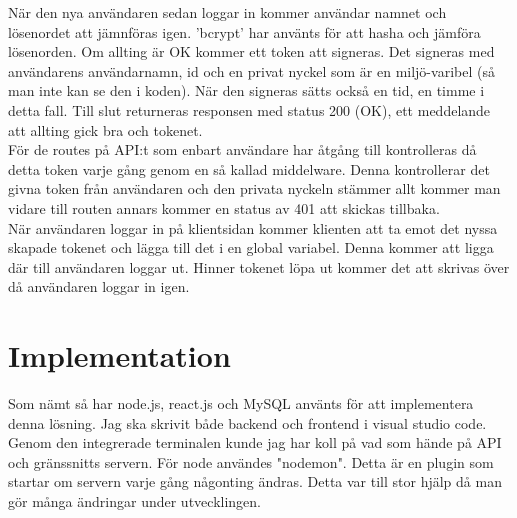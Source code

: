 \documentclass{article}
\begin{document}
\noindent
När den nya användaren sedan loggar in kommer användar namnet och lösenordet att jämnföras igen.
'bcrypt' har använts för att hasha och jämföra lösenorden. 
Om allting är OK kommer ett token att signeras.
Det signeras med användarens användarnamn, id och en privat nyckel som är en miljö-varibel (så man inte kan se den i koden). När den signeras sätts också en tid, en timme i detta fall. Till slut returneras responsen med status 200 (OK), ett meddelande att allting gick bra och tokenet.\\

\noindent
För de routes på API:t som enbart användare har åtgång till kontrolleras då detta token varje gång genom en så kallad middelware. Denna kontrollerar det givna token från användaren och den privata nyckeln stämmer allt kommer man vidare till routen annars kommer en status av 401 att skickas tillbaka.\\

\noindent
När användaren loggar in på klientsidan kommer klienten att ta emot det nyssa skapade tokenet och lägga till det i en global variabel. Denna kommer att ligga där till användaren loggar ut. Hinner tokenet löpa ut kommer det att skrivas över då användaren loggar in igen.


\section{Implementation}%
\label{sec:implementation}
Som nämt så har node.js, react.js och MySQL använts för att implementera denna lösning.
Jag ska skrivit både backend och frontend i visual studio code. Genom den integrerade terminalen kunde jag har koll på vad som hände på API och gränssnitts servern. 
För node användes "nodemon". Detta är en plugin som startar om servern varje gång någonting ändras. Detta var till stor hjälp då man gör många ändringar under utvecklingen.\\
\end{document}
